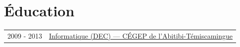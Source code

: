 
\section{Éducation}
\begin{tabularx}{\linewidth}{@{}l X@{}}	
2009 - 2013 & \href{https://www.cegepat.qc.ca/programmes-etudes/administration/techniques-informatique/}{Informatique (DEC) — CÉGEP de l'Abitibi-Témiscamingue} \\
\end{tabularx}

\vfill
